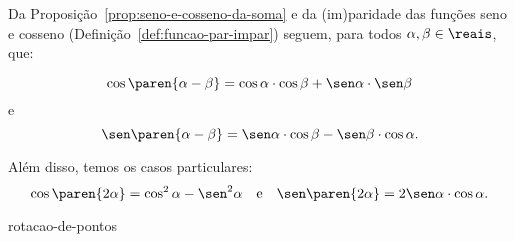 \begin{remark}
    Da Proposição~\ref{prop:seno-e-cosseno-da-soma} e da (im)paridade das funções seno e cosseno 
    (Definição~\ref{def:funcao-par-impar}) seguem, para todos $\alpha, \beta \in \reais$, que:

$$\cos \paren{\alpha - \beta} = \cos \alpha \cdot \cos \beta + \sen
\alpha \cdot \sen \beta$$ e
$$\sen \paren{\alpha - \beta} = \sen \alpha \cdot \cos \beta - \sen \beta \cdot
\cos \alpha.$$

Além disso, temos os casos particulares:
$$\cos \paren{2\alpha } = \cos^2 \alpha  - \sen^2 \alpha \ \ \text{ e }
\ \ \sen \paren{2\alpha } = 2\sen \alpha \cdot \cos \alpha.$$
\end{remark}

{rotacao-de-pontos}